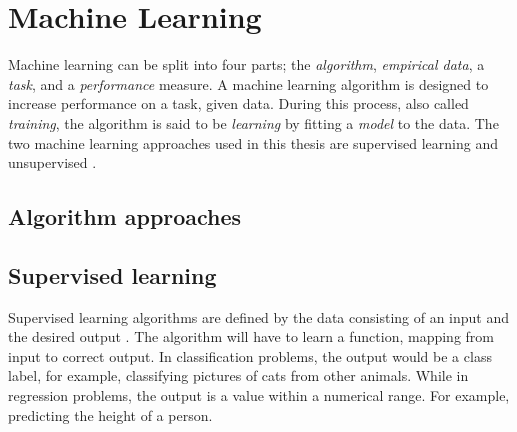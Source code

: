 





\section{Machine Learning} \label{Machine Learning}
    Machine learning can be split into four parts; the \textit{algorithm}, \textit{empirical data}, a \textit{task}, and a \textit{performance} measure. A machine learning algorithm is designed to increase performance on a task, given data. During this process, also called \textit{training}, the algorithm is said to be \textit{learning} by fitting a \textit{model} to the data. The two machine learning approaches used in this thesis are supervised learning and unsupervised \cite{Goodfellow-et-al-2016}. 
    
    \subsection{Algorithm approaches} \label{Algorithm types}
        \subsection{Supervised learning}
            Supervised learning  algorithms are defined by the data consisting of an input and the desired output \cite{Goodfellow-et-al-2016}. The algorithm will have to learn a function, mapping from input to correct output. In classification problems, the output would be a class label, for example, classifying pictures of cats from other animals. While in regression problems, the output is a value within a numerical range. For example, predicting the height of a person.
            

